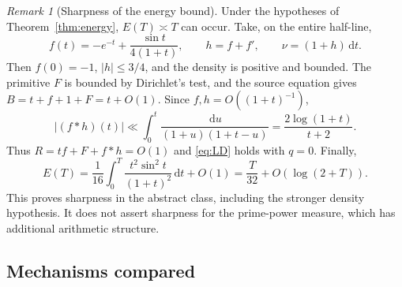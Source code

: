\documentclass[11pt,letterpaper]{article}
\numberwithin{equation}{section}
\theoremstyle{definition}
\theoremstyle{remark}
\newtheorem{remark}[theorem]{Remark}
\newcommand{\dd}{\,\mathrm d}
\begin{document}
\begin{remark}[Sharpness of the energy bound]\label{rem:energy-sharp}
Under the hypotheses of Theorem~\ref{thm:energy}, $E(T)\asymp T$ can occur.
Take, on the entire half-line,
\[
 f(t)=-e^{-t}+\frac{\sin t}{4(1+t)},\qquad
 h=f+f',\qquad \nu=(1+h)\dd t.
\]
Then $f(0)=-1$, $|h|\le3/4$, and the density is positive and bounded.
The primitive $F$ is bounded by Dirichlet's test, and the source equation
gives $B=t+f+1+F=t+O(1)$. Since $f,h=O((1+t)^{-1})$,
\[
 |(f*h)(t)|\ll\int_0^t\frac{\dd u}{(1+u)(1+t-u)}
 =\frac{2\log(1+t)}{t+2}.
\]
Thus $R=tf+F+f*h=O(1)$ and \eqref{eq:LD} holds with $q=0$.
Finally,
\[
 E(T)=\frac1{16}\int_0^T\frac{t^2\sin^2t}{(1+t)^2}\dd t+O(1)
     =\frac{T}{32}+O(\log(2+T)).
\]
This proves sharpness in the abstract class, including the stronger
density hypothesis. It does not assert sharpness for the prime-power
measure, which has additional arithmetic structure.
\end{remark}

\subsection{Mechanisms compared}\label{sec:lit-mechanisms}
\end{document}
